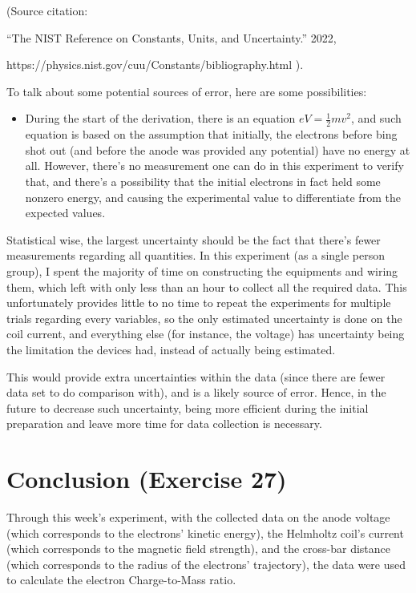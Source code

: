 \documentclass{article}
\begin{document}
(Source citation: 

``The NIST Reference on Constants, Units, and Uncertainty.'' 2022, 

https://physics.nist.gov/cuu/Constants/bibliography.html ).

\hfil

To talk about some potential sources of error, here are some possibilities:
\begin{itemize}
    \item During the start of the derivation, there is an equation $eV = \frac{1}{2}mv^2$, and such equation is based on the assumption that initially, the electrons before bing shot out (and before the anode was provided any potential) have no energy at all. However, there's no measurement one can do in this experiment to verify that, and there's a possibility that the initial electrons in fact held some nonzero energy, and causing the experimental value to differentiate from the expected values.
\end{itemize}
Statistical wise, the largest uncertainty should be the fact that there's fewer measurements regarding all quantities. In this experiment (as a single person group), I spent the majority of time on constructing the equipments and wiring them, which left with only less than an hour to collect all the required data. This unfortunately provides little to no time to repeat the experiments for multiple trials regarding every variables, so the only estimated uncertainty is done on the coil current, and everything else (for instance, the voltage) has uncertainty being the limitation the devices had, instead of actually being estimated. 

This would provide extra uncertainties within the data (since there are fewer data set to do comparison with), and is a likely source of error. Hence, in the future to decrease such uncertainty, being more efficient during the initial preparation and leave more time for data collection is necessary.

\hfil

\section{Conclusion (Exercise 27)}

Through this week's experiment, with the collected data on the anode voltage (which corresponds to the electrons' kinetic energy), the Helmholtz coil's current (which corresponds to the magnetic field strength), and the cross-bar distance (which corresponds to the radius of the electrons' trajectory), the data were used to calculate the electron Charge-to-Mass ratio. 
\end{document}
